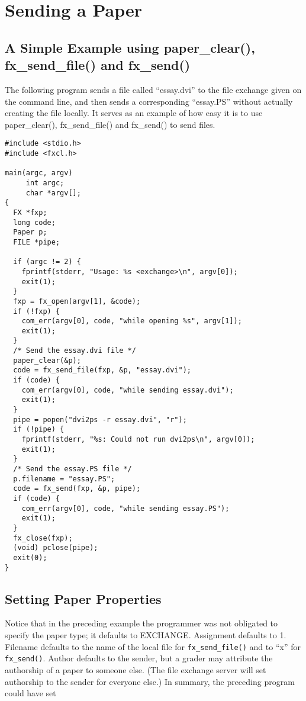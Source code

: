 \section{Sending a Paper}

\subsection{A Simple Example using paper\_clear(), fx\_send\_file() and fx\_send()}

The following program sends a file called ``essay.dvi'' to the file
exchange given on the command line, and then sends a corresponding
``essay.PS'' without actually creating the file locally.  It serves as
an example of how easy it is to use paper\_clear(), fx\_send\_file()
and fx\_send() to send files.

\pagebreak[4]

\begin{verbatim}
#include <stdio.h>
#include <fxcl.h>

main(argc, argv)
     int argc;
     char *argv[];
{
  FX *fxp;
  long code;
  Paper p;
  FILE *pipe;

  if (argc != 2) {
    fprintf(stderr, "Usage: %s <exchange>\n", argv[0]);
    exit(1);
  }
  fxp = fx_open(argv[1], &code);
  if (!fxp) {
    com_err(argv[0], code, "while opening %s", argv[1]);
    exit(1);
  }
  /* Send the essay.dvi file */
  paper_clear(&p);
  code = fx_send_file(fxp, &p, "essay.dvi");
  if (code) {
    com_err(argv[0], code, "while sending essay.dvi");
    exit(1);
  }
  pipe = popen("dvi2ps -r essay.dvi", "r");
  if (!pipe) {
    fprintf(stderr, "%s: Could not run dvi2ps\n", argv[0]);
    exit(1);
  }
  /* Send the essay.PS file */
  p.filename = "essay.PS";
  code = fx_send(fxp, &p, pipe);
  if (code) {
    com_err(argv[0], code, "while sending essay.PS");
    exit(1);
  }
  fx_close(fxp);
  (void) pclose(pipe);
  exit(0);
}
\end{verbatim}

\subsection{Setting Paper Properties}

Notice that in the preceding example the programmer was not obligated
to specify the paper type; it defaults to EXCHANGE.  Assignment
defaults to 1.  Filename defaults to the name of the local file for
\verb+fx_send_file()+ and to ``x'' for \verb+fx_send()+.  Author
defaults to the sender, but a grader may attribute the authorship of a
paper to someone else.  (The file exchange server will set authorship
to the sender for everyone else.)  In summary, the preceding program
could have set

